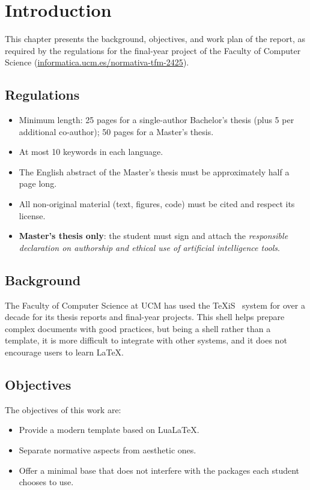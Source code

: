 \chapter{Introduction}

This chapter presents the background, objectives, and work plan of
the report, as required by the regulations for the final-year
project of the Faculty of Computer Science
(\href{https://informatica.ucm.es/normativa-tfm-2425}{informatica.ucm.es/normativa-tfm-2425}).

\section{Regulations}

\begin{itemize}\setlength{\itemsep}{0pt}
  \item Minimum length: 25 pages for a single-author Bachelor's
        thesis (plus 5 per additional co-author); 50 pages for a
        Master's thesis.
  \item At most 10 keywords in each language.
  \item The English abstract of the Master's thesis must be
        approximately half a page long.
  \item All non-original material (text, figures, code) must be
        cited and respect its license.
  \item \textbf{Master's thesis only}: the student must sign and
        attach the \emph{responsible declaration on authorship and
        ethical use of artificial intelligence tools}.
\end{itemize}

\section{Background}

The Faculty of Computer Science at UCM has used the TeXiS~\cite{texis}
system for over a decade for its thesis reports and final-year
projects. This shell helps prepare complex documents with good
practices, but being a shell rather than a template, it is more
difficult to integrate with other systems, and it does not
encourage users to learn LaTeX.

\section{Objectives}

The objectives of this work are:
\begin{itemize}
  \item Provide a modern template based on LuaLaTeX.
  \item Separate normative aspects from aesthetic ones.
  \item Offer a minimal base that does not interfere with the
        packages each student chooses to use.
\end{itemize}
